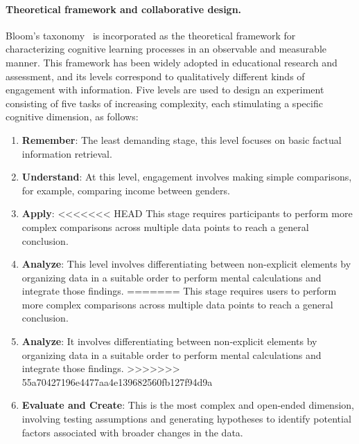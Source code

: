 \paragraph{Theoretical framework and collaborative design.}
Bloom's taxonomy~\cite{anderson2001taxonomy, bloom1956taxonomy} is incorporated as the theoretical framework for characterizing cognitive learning processes in an observable and measurable manner.
This framework has been widely adopted in educational research and assessment, and its levels correspond to qualitatively different kinds of engagement with information.
Five levels are used to design an experiment consisting of five tasks of increasing complexity, each stimulating a specific cognitive dimension, as follows:
\begin{enumerate}
    \item 
    \textbf{Remember}: 
    The least demanding stage, this level focuses on basic factual information retrieval.

    \item 
    \textbf{Understand}:
    At this level, engagement involves making simple comparisons, for example, comparing income between genders.

    \item 
    \textbf{Apply}:
<<<<<<< HEAD
    This stage requires participants to perform more complex comparisons across multiple data points to reach a general conclusion.

    \item 
    \textbf{Analyze}:
    This level involves differentiating between non-explicit elements by organizing data in a suitable order to perform mental calculations and integrate those findings.
=======
    This stage requires users to perform more complex comparisons across multiple data points to reach a general conclusion.

    \item 
    \textbf{Analyze}:
    It involves differentiating between non-explicit elements by organizing data in a suitable order to perform mental calculations and integrate those findings.
>>>>>>> 55a70427196e4477aa4e139682560fb127f94d9a

    \item 
    \textbf{Evaluate and Create}: This is the most complex and open-ended dimension, involving testing assumptions and generating hypotheses to identify potential factors associated with broader changes in the data.
\end{enumerate}

